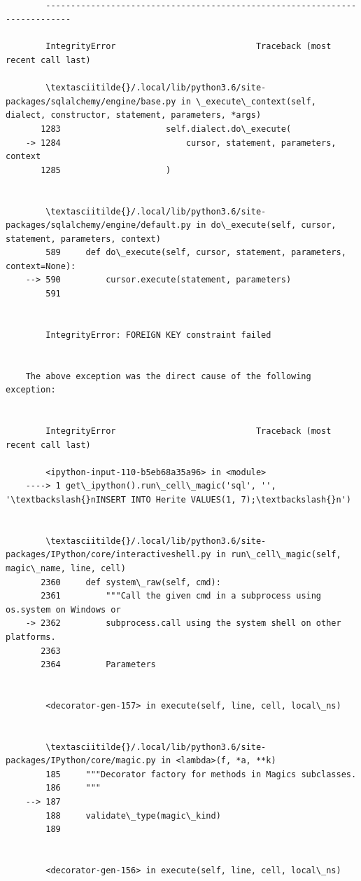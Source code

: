 \documentclass[11pt]{article}
\begin{document}
    \begin{Verbatim}[commandchars=\\\{\}]

        ---------------------------------------------------------------------------

        IntegrityError                            Traceback (most recent call last)

        \textasciitilde{}/.local/lib/python3.6/site-packages/sqlalchemy/engine/base.py in \_execute\_context(self, dialect, constructor, statement, parameters, *args)
       1283                     self.dialect.do\_execute(
    -> 1284                         cursor, statement, parameters, context
       1285                     )


        \textasciitilde{}/.local/lib/python3.6/site-packages/sqlalchemy/engine/default.py in do\_execute(self, cursor, statement, parameters, context)
        589     def do\_execute(self, cursor, statement, parameters, context=None):
    --> 590         cursor.execute(statement, parameters)
        591 


        IntegrityError: FOREIGN KEY constraint failed

        
    The above exception was the direct cause of the following exception:


        IntegrityError                            Traceback (most recent call last)

        <ipython-input-110-b5eb68a35a96> in <module>
    ----> 1 get\_ipython().run\_cell\_magic('sql', '', '\textbackslash{}nINSERT INTO Herite VALUES(1, 7);\textbackslash{}n')
    

        \textasciitilde{}/.local/lib/python3.6/site-packages/IPython/core/interactiveshell.py in run\_cell\_magic(self, magic\_name, line, cell)
       2360     def system\_raw(self, cmd):
       2361         """Call the given cmd in a subprocess using os.system on Windows or
    -> 2362         subprocess.call using the system shell on other platforms.
       2363 
       2364         Parameters


        <decorator-gen-157> in execute(self, line, cell, local\_ns)


        \textasciitilde{}/.local/lib/python3.6/site-packages/IPython/core/magic.py in <lambda>(f, *a, **k)
        185     """Decorator factory for methods in Magics subclasses.
        186     """
    --> 187 
        188     validate\_type(magic\_kind)
        189 


        <decorator-gen-156> in execute(self, line, cell, local\_ns)



\end{Verbatim}
\end{document}
